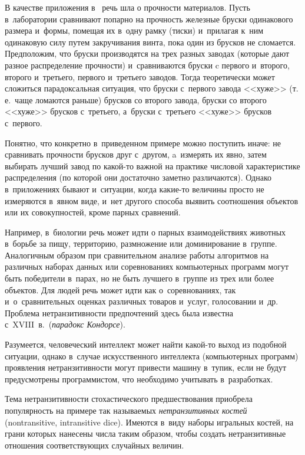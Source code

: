 \begin{multicols}{2}
В качестве приложения в~\cite{Tryb} речь шла о прочности материалов. 
Пусть в~лаборатории сравнивают попарно на прочность железные бруски одинакового 
размера и~формы, помещая их в~одну рамку (тиски) и~прилагая к~ним одинаковую силу 
путем закручивания винта, пока один из брусков не сломается. Предположим, 
что бруски производятся на трех разных заводах (которые дают разное распределение
прочности) и~сравниваются бруски c первого и~второго, второго и~третьего, 
первого и~третьего заводов. Тогда теоретически может сложиться парадоксальная 
ситуация, что бруски с~первого завода <<хуже>> (т.\,е.\ чаще ломаются раньше) 
брусков со второго завода, бруски со второго <<хуже>> брусков с~третьего, 
а~бруски с~третьего <<хуже>> брусков с~первого.

Понятно, что конкретно в~приведенном примере можно поступить иначе: не 
сравнивать проч\-ности брусков друг с~другом, a~измерять их явно, затем выбирать 
лучший завод по ка\-кой-то важной на практике числовой характеристике распределения 
(по которой они достаточно заметно различаются). Однако в~приложениях бывают 
и~ситуации, когда ка\-кие-то величины просто не измеряются в~явном виде, 
и~нет другого способа выявить соотношения объектов или их совокупностей, 
кроме парных сравнений.

Например, в~биологии речь может идти о парных взаимодействиях животных в~борьбе 
за пищу, территорию, размножение или доминирование в~группе. Аналогичным образом 
при сравнительном анализе работы
алгоритмов на различных наборах данных или соревнованиях компьютерных программ 
могут быть
победители в~парах, но не быть лучшего в~группе из трех или более объектов. 
Для людей речь может идти как о~соревнованиях, так и~о~сравнительных оценках 
различных товаров и~услуг, голосовании и~др. Проблема нетранзитивности 
предпочтений здесь была известна с~XVIII~в.\ (\textit{парадокс Кондорсе}).

Разумеется, человеческий интеллект может \mbox{найти} ка\-кой-то выход из подобной
 ситуации, однако в~случае искусственного интеллекта (компьютерных программ) 
 проявления нетранзитивности могут привести машину в~тупик, если не будут 
 преду\-смот\-ре\-ны программистом, что необходимо учитывать в~разработках.

Тема нетранзитивности стохастического предшествования приобрела популярность 
на примере так называемых \textit{нетранзитивных костей} (nontransitive, 
intransitive dice).
Имеются в~виду наборы игральных костей, на грани которых нанесены чис\-ла таким образом,
чтобы создать нетранзитивные отношения соответствующих случайных величин.


\end{multicols}
